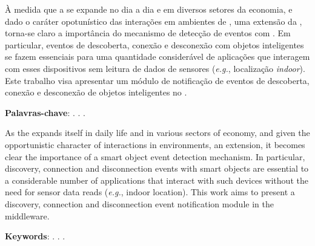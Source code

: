 \setlength{\absparsep}{18pt} %
\begin{resumo}
	À medida que a \iot se expande no dia a dia e em diversos setores da economia, e dado o caráter opotunístico das interações em ambientes de \iomt, uma extensão da \iot, torna-se claro a importância do mecanismo de detecção de eventos com \smartobjs.
	Em particular, eventos de descoberta, conexão e desconexão com objetos inteligentes se fazem essenciais para uma quantidade considerável de aplicações que interagem com esses dispositivos sem leitura de dados de sensores (\textit{e.g.}, localização \textit{indoor}).
	Este trabalho visa apresentar um módulo de notificação de eventos de descoberta, conexão e desconexão de objetos inteligentes no \middleware \mhubcddl.

	\textbf{Palavras-chave}: \iot. \iomt. \Middleware.
\end{resumo}

\begin{resumo}[Abstract]
	As the \iot expands itself in daily life and in various sectors of economy, and given the opportunistic character of interactions in \iomt environments, an \iot extension, it becomes clear the importance of a smart object event detection mechanism.
	In particular, discovery, connection and disconnection events with smart objects are essential to a considerable number of applications that interact with such devices without the need for sensor data reads (\textit{e.g.}, indoor location).
	This work aims to present a discovery, connection and disconnection event notification module in the \mhubcddl middleware.

	\textbf{Keywords}: \iot. \iomt. \Middleware.
\end{resumo}
